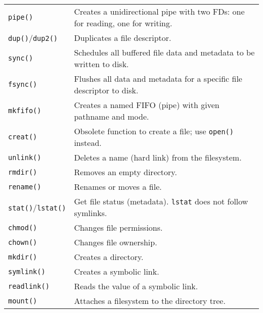 \documentclass[openany,12pt]{book}
\newcommand{\code}[1]{\texttt{#1}}
\begin{document}
\begin{longtable}{|>{\raggedright\arraybackslash}p{3.5cm}|>{\raggedright\arraybackslash}p{11.5cm}|}
  \code{pipe()}     & Creates a unidirectional pipe with two FDs: one for reading, one for writing.                     \\
  \code{dup()}/\code{dup2()} & Duplicates a file descriptor.                                                               \\
  \code{sync()}     & Schedules all buffered file data and metadata to be written to disk.                              \\
  \code{fsync()}    & Flushes all data and metadata for a specific file descriptor to disk.                             \\
  \hline
  \code{mkfifo()}   & Creates a named FIFO (pipe) with given pathname and mode.                                         \\
  \code{creat()}    & Obsolete function to create a file; use \code{open()} instead.                                    \\
  \code{unlink()}   & Deletes a name (hard link) from the filesystem.                                                   \\
  \code{rmdir()}    & Removes an empty directory.                                                                       \\
  \code{rename()}   & Renames or moves a file.                                                                          \\
  \code{stat()}/\code{lstat()} & Get file status (metadata). \code{lstat} does not follow symlinks.                         \\
  \code{chmod()}    & Changes file permissions.                                                                         \\
  \code{chown()}    & Changes file ownership.                                                                           \\
  \code{mkdir()}    & Creates a directory.                                                                              \\
  \code{symlink()}  & Creates a symbolic link.                                                                          \\
  \code{readlink()} & Reads the value of a symbolic link.                                                               \\
  \code{mount()}    & Attaches a filesystem to the directory tree.                                                      \\

\end{longtable}
\end{document}
